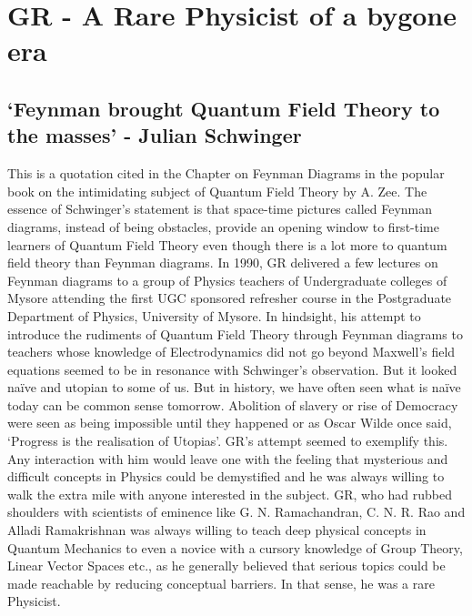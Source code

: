 \chapter{GR - A Rare Physicist of a bygone era}\label{chap15}


\section*{`Feynman brought Quantum Field Theory to the masses' - Julian Schwinger}

This is a quotation cited in the Chapter on Feynman Diagrams in the popular book on the intimidating subject of Quantum Field Theory by A. Zee. The essence of Schwinger's statement is that space-time pictures called Feynman diagrams, instead of being obstacles, provide an opening window to first-time learners of Quantum Field Theory even though there is a lot more to quantum field theory than Feynman diagrams. In 1990, GR delivered a few lectures on Feynman diagrams to a group of Physics teachers of Undergraduate colleges of Mysore attending the first UGC sponsored refresher course in the Postgraduate Department of Physics, University of Mysore. In hindsight, his attempt to introduce the rudiments of Quantum Field Theory through Feynman diagrams to teachers whose knowledge of Electrodynamics did not go beyond Maxwell's field equations seemed to be in resonance with Schwinger's observation. But it looked na\"{i}ve and utopian to some of us. But in history, we have often seen what is na\"{i}ve today can be common sense tomorrow. Abolition of slavery or rise of Democracy were seen as being impossible until they happened or as Oscar Wilde once said, `Progress is the realisation of Utopias'. GR's attempt seemed to exemplify this. Any interaction with him would leave one with the feeling that mysterious and difficult concepts in Physics could be demystified and he was always willing to walk the extra mile with anyone interested in the subject. GR, who had rubbed shoulders with scientists of eminence like G. N. Ramachandran, C. N. R. Rao and Alladi Ramakrishnan was always willing to teach deep physical concepts in Quantum Mechanics to even a novice with a cursory knowledge of Group Theory,  Linear Vector Spaces etc., as he generally believed that serious topics could be made reachable by reducing conceptual barriers. In that sense, he was a rare Physicist.

